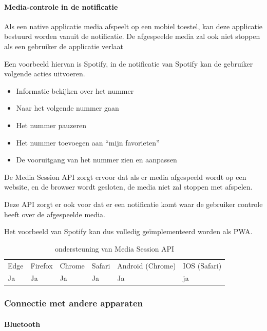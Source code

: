 \paragraph{Media-controle in de notificatie }


Als een native applicatie media afspeelt op een mobiel toestel, kan deze applicatie bestuurd worden vanuit de notificatie. De afgespeelde media zal ook niet stoppen als een gebruiker de applicatie verlaat

Een voorbeeld hiervan is Spotify, in de notificatie van Spotify kan de gebruiker volgende acties uitvoeren.
 \begin{itemize}
   \item	Informatie bekijken over het nummer
   \item	Naar het volgende nummer gaan
   \item	Het nummer pauzeren
   \item	Het nummer toevoegen aan “mijn favorieten”
   \item	De vooruitgang van het nummer zien en aanpassen
\end{itemize}
De Media Session API \autocite{Beaufort2019} zorgt ervoor dat als er media afgespeeld wordt op een website, en de browser wordt gesloten, de media niet zal stoppen met afspelen.

Deze API zorgt er ook voor dat er een notificatie komt waar de gebruiker controle heeft over de afgespeelde media. 

Het voorbeeld van Spotify kan dus volledig geïmplementeerd worden als PWA.

\begin{table}[H]
	\centering
	\begin{tabular}{llllll}
		Edge & Firefox & Chrome & Safari & Android (Chrome) & IOS (Safari) \\
		Ja   & Ja      & Ja     & Ja     & Ja               & ja          
	\end{tabular}	
	\caption{ondersteuning van Media Session API}
	\label{oondersteuning van Media Session API}
\end{table}



\subsubsection{Connectie met andere apparaten}



\paragraph{Bluetooth }

